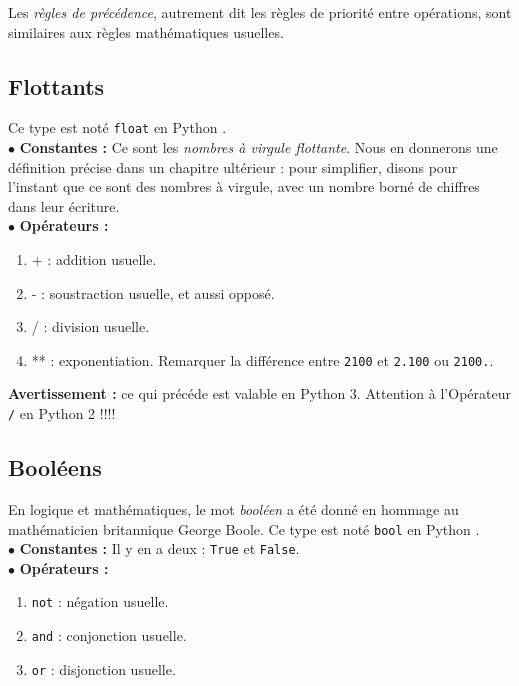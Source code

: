 Les \emph{règles de précédence}, autrement dit les règles de priorité entre opérations, sont 
similaires aux règles mathématiques usuelles.

\subsection{Flottants}

Ce type est noté \texttt{float} en Python .\\

\noindent$\bullet$ \textbf{Constantes :} Ce sont les \emph{nombres à virgule flottante}. Nous en
donnerons une définition précise dans un chapitre ultérieur : pour simplifier, disons pour 
l'instant que ce sont des nombres à virgule, avec un nombre borné de chiffres dans leur écriture.\\

\noindent$\bullet$ \textbf{Opérateurs :}
\begin{enumerate}
 \item + : addition usuelle.
 \item - : soustraction usuelle, et aussi opposé.
\item  / : division usuelle.
\item ** : exponentiation. Remarquer la différence entre \texttt{2\raisebox{0.3ex}{**}100} et 
\texttt{2.\raisebox{0.3ex}{**}100} ou \texttt{2\raisebox{0.3ex}{**}100.}.
\end{enumerate}

\noindent\textbf{Avertissement :} ce qui précéde est valable en Python 3. Attention à l'Opérateur 
\texttt{/} en Python 2 !!!!\\

\subsection{Booléens}

En logique et mathématiques, le mot \emph{booléen} a été donné en hommage au mathématicien 
britannique George Boole. Ce type est noté \texttt{bool} en Python .\\

\noindent$\bullet$ \textbf{Constantes :} Il y en a deux : \texttt{True} et \texttt{False}.\\

\noindent$\bullet$ \textbf{Opérateurs :}
\begin{enumerate}
 \item \texttt{not} : négation usuelle.
 \item \texttt{and} : conjonction usuelle.
 \item \texttt{or} : disjonction usuelle.
\end{enumerate}

